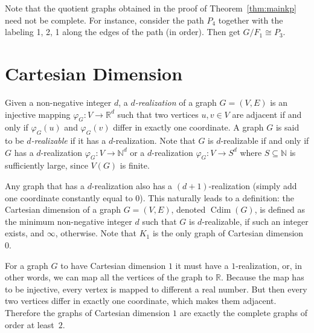 \documentclass[12pt,a4paper,titlepage,openany]{report}
\DeclareMathOperator{\Cdim}{Cdim}
\begin{document}
Note that the quotient graphs obtained in the proof of Theorem~\ref{thm:mainkp} need not be complete. For instance, consider the path $P_4$ together with the labeling 1, 2, 1 along the edges of the path (in order). Then get $G/ F_1\cong P_3$.

\chapter{Cartesian Dimension}\label{cdim-chapter}

Given a non-negative integer $d$, a \emph{$d$-realization} of a graph $G=(V,E)$ is an injective mapping $\varphi_G:V\to \mathbb{R}^d$ such that two vertices $u, v \in V$ are adjacent if and only if $\varphi_G(u)$ and $\varphi_G(v)$ differ in exactly one coordinate. A graph $G$ is said to be \emph{$d$-realizable} if it has a \hbox{$d$-realization}. Note that $G$ is $d$-realizable if and only if $G$ has a $d$-realization $\varphi_G : V \rightarrow \mathbb{N}^d$ or a $d$-realization $\varphi_G:V\to S^d$ where $S\subseteq \mathbb{N}$ is sufficiently large, since $V(G)$ is finite.

Any graph that has a $d$-realization also has a $(d+1)$-realization (simply add one coordinate constantly equal to $0$). This naturally leads to a definition: the Cartesian dimension of a graph $G = (V, E)$, denoted $\Cdim(G)$, is defined as the minimum non-negative integer $d$ such that $G$ is $d$-realizable, if such an integer exists, and $\infty$, otherwise. Note that $K_1$ is the only graph of Cartesian dimension 0.

For a graph $G$ to have Cartesian dimension $1$ it must have a $1$-realization, or, in other words, we can map all the vertices of the graph to $\mathbb{R}$. Because the map has to be injective, every vertex is mapped to different a real number. But then every two vertices differ in exactly one coordinate, which makes them adjacent. Therefore the graphs of Cartesian dimension $1$ are exactly the complete graphs of order at least~$2$.
\end{document}
